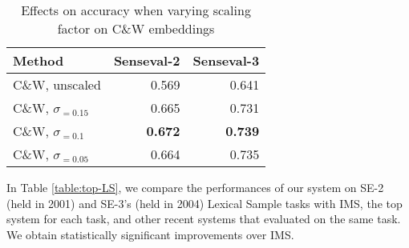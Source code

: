 \begin{table}[th]
	\caption{Effects on accuracy when varying scaling factor on C\&W embeddings}
	\label{table:wordembeddings-accuracy}
	\begin{center}
        \begin{tabular}{| l | r | r |}
			\hline
			Method & Senseval-2 & Senseval-3 \\
			\hline
			C\&W, unscaled & 0.569 & 0.641 \\
			\hline
			C\&W, $\sigma _{=0.15}$ & 0.665 & 0.731 \\
			\hline
			C\&W, $\sigma _{=0.1}$ & {\bf0.672} & {\bf0.739} \\
			\hline
			C\&W, $\sigma _{=0.05}$ & 0.664 & 0.735 \\
			\hline
		\end{tabular}
	\end{center}
\end{table}



In Table \ref{table:top-LS}, we compare the performances of our system
on SE-2 (held in 2001) and SE-3's (held in 2004) Lexical
Sample tasks with IMS, the top system for each task, and other recent
systems that evaluated on the same task. We obtain statistically significant improvements over IMS.



